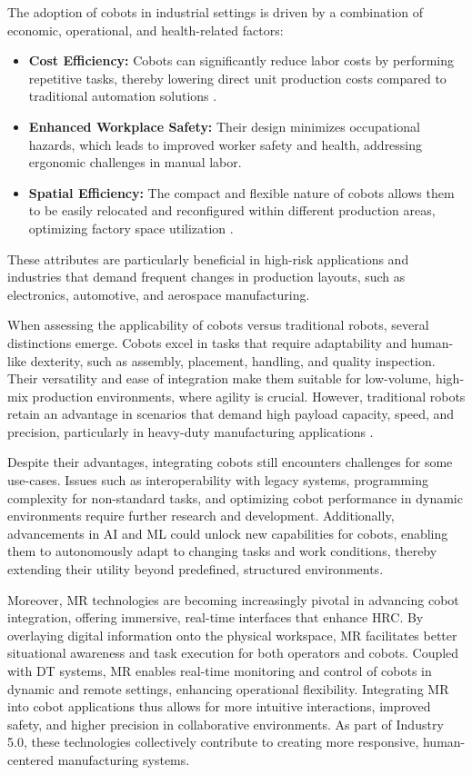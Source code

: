 The adoption of cobots in industrial settings is driven by a combination of economic, operational, and health-related factors:
\begin{itemize}
    \item \textbf{Cost Efficiency:} Cobots can significantly reduce labor costs by performing repetitive tasks, thereby lowering direct unit production costs compared to traditional automation solutions \cite{cobot-2019collaborative}.
    \item \textbf{Enhanced Workplace Safety:} Their design minimizes occupational hazards, which leads to improved worker safety and health, addressing ergonomic challenges in manual labor.
    \item \textbf{Spatial Efficiency:} The compact and flexible nature of cobots allows them to be easily relocated and reconfigured within different production areas, optimizing factory space utilization \cite{cobots-implementation}.
\end{itemize}


These attributes are particularly beneficial in high-risk applications and industries that demand frequent changes in production layouts, such as electronics, automotive, and aerospace manufacturing.

When assessing the applicability of cobots versus traditional robots, several distinctions emerge. Cobots excel in tasks that require adaptability and human-like dexterity, such as assembly, placement, handling, and quality inspection. Their versatility and ease of integration make them suitable for low-volume, high-mix production environments, where agility is crucial. However, traditional robots retain an advantage in scenarios that demand high payload capacity, speed, and precision, particularly in heavy-duty manufacturing applications \cite{robotics8040100}.

Despite their advantages, integrating cobots still encounters challenges for some use-cases. Issues such as interoperability with legacy systems, programming complexity for non-standard tasks, and optimizing cobot performance in dynamic environments require further research and development. Additionally, advancements in \ac{AI} and \ac{ML} could unlock new capabilities for cobots, enabling them to autonomously adapt to changing tasks and work conditions, thereby extending their utility beyond predefined, structured environments.

Moreover, \ac{MR} technologies are becoming increasingly pivotal in advancing cobot integration, offering immersive, real-time interfaces that enhance \ac{HRC}. By overlaying digital information onto the physical workspace, \ac{MR} facilitates better situational awareness and task execution for both operators and cobots. Coupled with \ac{DT} systems, \ac{MR} enables real-time monitoring and control of cobots in dynamic and remote settings, enhancing operational flexibility. Integrating \ac{MR} into cobot applications thus allows for more intuitive interactions, improved safety, and higher precision in collaborative environments. As part of Industry 5.0, these technologies collectively contribute to creating more responsive, human-centered manufacturing systems.
